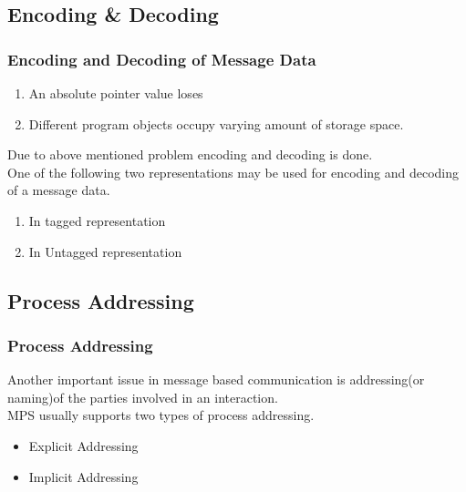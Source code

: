 \documentclass{beamer}
\begin{document}
\subsection{Encoding & Decoding}
\begin{frame}
	\frametitle{Encoding and Decoding of Message Data}
	\begin{enumerate}
		\item An absolute pointer value loses
		\item Different program objects occupy varying amount of storage space.
	\end{enumerate}
	Due to above mentioned problem encoding and decoding is done.\\
	One of the following two representations may be used for encoding and decoding of a message data.
	\begin{enumerate}
		\item In tagged representation
		\item In Untagged representation
	\end{enumerate}
\end{frame}


\subsection{Process Addressing}
\begin{frame}
	\frametitle{Process Addressing}
	Another important issue in message based communication is addressing(or naming)of the
	parties involved in an interaction.\\MPS usually supports two types of process
	addressing.
	\vspace{0.5cm}
	\begin{itemize}
		\item Explicit Addressing
		\item Implicit Addressing
	\end{itemize}
	\vspace{5cm}
\end{frame}
\end{document}
